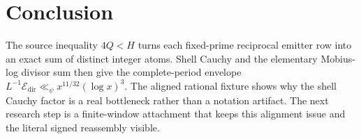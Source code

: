 \documentclass[11pt]{article}
\theoremstyle{definition}
\theoremstyle{remark}
\newcommand{\Edir}{\mathcal E_{\mathrm{dir}}}
\begin{document}
\section{Conclusion}

The source inequality \(4Q<H\) turns each fixed-prime reciprocal emitter row
into an exact sum of distinct integer atoms.  Shell Cauchy and the elementary
Mobius-log divisor sum then give the complete-period envelope
\(L^{-1}\Edir\ll_\psi x^{11/32}(\log x)^3\).  The aligned rational fixture
shows why the shell Cauchy factor is a real bottleneck rather than a notation
artifact.  The next research step is a finite-window attachment that keeps this
alignment issue and the literal signed reassembly visible.



\end{document}

